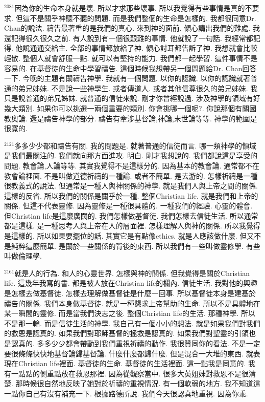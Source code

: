 \documentclass{book}
\begin{document}
$^{2081}$因為你的生命本身就是壞.
所以才求那些壞事.
所以我覺得有些事情是真的不要求.
但這不是關乎神聽不聽的問題.
而是我們整個的生命是怎樣的.
我都很同意Dr. Chan的說法.
禱告最著重的是我們的真心.
來到神的面前.
傾心講出我們的難處.
我還記得很久很久之前.
有人說到有一個很艱難的事情.
他就說了一句話.
我經常都記得.
他說通通交給主.
全部的事情都放給了神.
傾心討耳都告訴了神.
我想就會比較輕散.
整個人就會舒服一點.
就可以有堅持的能力.
我們都一起學習.
這件事情不是容易的.
在基督徒的生命中學習禱告.
這個時候我想帶另一個問題給Dr. Chan回答一下.
今晚的主題有關禱告神學.
我就有一個問題.
以你的認識.
以你的認識就著普通的弟兄姊妹.
不是說一些神學生.
或者傳道人.
或者其他信尊很久的弟兄姊妹.
我只是說普通的弟兄姊妹.
就普通的信徒來說.
剛才你曾經說過.
涉及神學的領域有好幾大類別.
如果你可以挑選一兩個重要的類別.
你會挑哪一個呢?.
你說那個有關國教奧論.
還是禱告神學的部分.
禱告有牽涉基督論,神論,末世論等等.
神學的範圍是很寬的.

$^{2121}$多多少少都和禱告有關.
我的問題是.
就著普通的信徒而言.
哪一類神學的領域是我們最關注的.
我們就向那方面進攻.
明白.
剛才我想說的.
我們都說這是享受的問題.
教會論,人論等等.
其實我覺得不是這樣分的.
因為基本的教會論.
通常都不在教會論裡面.
不是叫做道德祈禱的一種論.
或者不簡單.
是去游的.
怎樣祈禱是一種很教義式的說法.
但通常是一種人與神關係的神學.
就是我們人與上帝之間的關係.
這樣的反省.
所以我們的關係是關乎於一種.
整個Christian life.
就是我們和上帝的關係.
但這不代表靈修.
因為靈修是一種很具體的.
一種我們的經驗.
心靈的體會.
但Christian life是這麼廣闊的.
我們怎樣做基督徒.
我們怎樣去信徒生活.
所以通常都是這樣.
是一種思考人與上帝在人的層面裡.
怎樣理解人與神的關係.
所以我覺得是這樣的.
所以如果要擺位的話.
其實它是有點像ethics.
就是人應該做什麼.
但又不是純粹這麼簡單.
是關於一些關係的背後的東西.
所以我們有一些叫做靈修學.
有些叫做倫理學.

$^{2161}$就是人的行為.
和人的心靈世界.
怎樣與神的關係.
但我覺得是關於Christian life.
這幾年我寫的書.
都是被人放在Christian life的欄內.
信徒生活.
我對他的興趣是怎樣去做基督徒.
怎樣去理解做基督徒是什麼一回事.
所以基督徒本身是建基於禱告的關係.
我們本身做基督徒.
就是一種懇求上帝幫助的生命.
所以不是具體地在某一瞬間的靈修.
而是當我們決志之後.
整個Christian life的生活.
那種神學.
所以不是那一輪.
而是信徒生活的神學.
我自己有一個小小的想法.
就是如果我們對我們的救恩是認真的.
如果我們對耶穌基督的拯救是認真的.
如果我們對聖靈的引領也是認真的.
多多少少都會帶動到我們重視祈禱的動作.
我很贊同你的看法.
不是一定要很條條快快地基督論歸基督論.
什麼什麼都歸什麼.
但是混合一大堆的東西.
就表現在Christian life裡面.
基督徒的生命.
基督徒的生活裡面.
這一點我是同意的.
我有一點點的側重點放在救恩那裡.
因為從觀察當中.
很多大英姐妹對救恩不是很清楚.
那時候很自然地反映了她對於祈禱的重視情況.
有一個軟弱的地方.
我不知道這一點你自己有沒有補充一下.
根據路德所說.
我們今天很認真地重視.
因為你乖.
\end{document}
